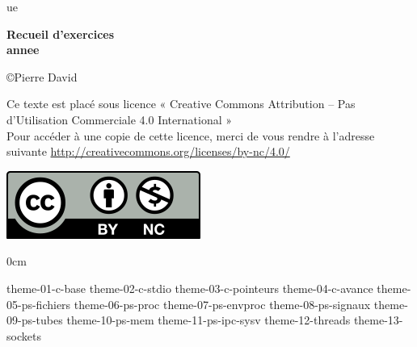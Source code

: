 \documentclass  [twoside] {report}
\newcommand {\tassertoc} {{ \setlength {\parskip} {0cm} \tableofcontents }}
\newcommand {\marquerchapitre} [1]
    {
        \addcontentsline {toc} {chapter} {#1}
        \markboth {#1} {#1}
    }
\newcommand {\chapitresanstitre} [1]
    {
        \cleardoublepage
	\marquerchapitre {#1}
    }
\newcommand {\titrechapitre} [1]
    {
	\begin {center}
	    \Large \bf #1
	\end {center}
	\bigskip
	\bigskip
    }
\newcommand {\chapitre} [1]
    {
        \chapitresanstitre {#1}
        \titrechapitre {#1}
    }
\newcounter {td}
\newcounter {tp}
\newcounter {exercice} [tp]
\begin{document}
\thispagestyle {empty}

\begin {titlepage}
     {ue}

    \vfill

    \begin {center}
	\huge\bf
	Recueil d'exercices \\
	\vspace* {5mm}
	 {annee}
    \end {center}

    \vfill

    \begin {center}
	\copyright Pierre David

        Ce texte est placé sous licence « Creative Commons Attribution
	-- Pas d’Utilisation Commerciale 4.0 International » \\
        Pour accéder à une copie de cette licence,
        merci de vous rendre à l'adresse suivante
        \url {http://creativecommons.org/licenses/by-nc/4.0/}

        \includegraphics [scale=.5] {by-nc}
    \end {center}
\end {titlepage}

\cleardoublepage
\tassertoc


% 
% 
% 
% 
% 
% 
% 


 {theme-01-c-base}
 {theme-02-c-stdio}
 {theme-03-c-pointeurs}
 {theme-04-c-avance}
 {theme-05-ps-fichiers}
 {theme-06-ps-proc}
 {theme-07-ps-envproc}
 {theme-08-ps-signaux}
 {theme-09-ps-tubes}
 {theme-10-ps-mem}
 {theme-11-ps-ipc-sysv}
 {theme-12-threads}
 {theme-13-sockets}
\end{document}
